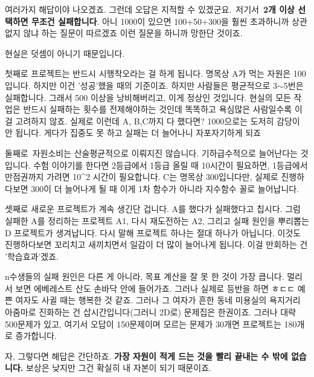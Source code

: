 여러가지 해답이야 나오겠죠.
그런데 오답은 지적할 수 있겠군요. 저기서 \textbf{2개 이상 선택하면 무조건 실패합니다}.
아니 1000이 있으면 100+50+300을 훨씬 초과하니까 상관없지 않냐 하는 질문이 따르겠죠
이런 질문을 하니까 망한단 것이죠.
\vspace{5mm}

현실은 덧셈이 아니기 때문입니다.
\vspace{5mm}

첫째로 프로젝트는 반드시 시행착오라는 걸 하게 됩니다.
명목상 A가 먹는 자원은 100입니다. 하지만 이건 '성공'했을 때의 기준이죠.
하지만 사람들은 평균적으로 3$\sim$5번은 실패합니다. 그래서 500 이상을 낭비해버리고, 이게 정상인 것입니다.
현실의 모든 작업은 반드시 실패하는 횟수를 전제해야하는 것인데 똑똑하고 욕심많은 사람일수록 이걸 고려하지 않죠.
실제로 이런데 A, B,C까지 다 했다면? 1000으로는 도저히 감당이 안 됩니다. 게다가 집중도 못 하고 실패는 더 늘어나니 자포자기하게 되죠
\vspace{5mm}

둘째로 자원소비는 산술평균적으로 이뤄지진 않습니다. 기하급수적으로 늘어난다는 것입니다.
수험 이야기를 한다면 2등급에서 1등급 올릴 때 10시간이 필요하면, 1등급에서 만점권까지 가려면 10^2 시간이 필요합니다.
C는 명목상 300입니다만, 실제로 진행하다보면 300이 더 늘어나게 될 때 이게 1차 함수가 아니라 지수함수 꼴로 늘어납니다.
\vspace{5mm}

셋째로 새로운 프로젝트가 계속 생긴단 겁니다.
A를 했다가 실패했다고 칩시다. 그럼 실패한 A를 정리하는 프로젝트 A1, 다시 재도전하는 A2, 그리고 실패 원인을 뿌리뽑는 D 프로젝트가 생겨납니다.
다시 말해 프로젝트 하나는 절대 하나가 아닙니다. 이것도 진행하다보면 꼬리치고 새끼치면서 일감이 더 많이 늘어나게 됩니다.
이걸 만회하는 건 '학습효과'겠죠.
\vspace{5mm}

n수생들의 실패 원인은 다른 게 아니라, 목표 계산을 잘 못 한 것이 가장 큽니다.
멀리서 보면 에베레스트 산도 손바닥 안에 들어가죠. 그러나 실제로 등반을 하면 ㅎㄷㄷ
예쁜 여자도 사귈 때는 행복한 것 같죠. 그러나 그 여자가 흔한 동네 미용실의 욕지거리 아줌마로 진화하는 건 삽시간입니다(그러니 2D로)
문제집은 한권이죠. 그러나 대략 500문제가 있고, 여기서 오답이 150문제이며 모르는 문제가 30개면 프로젝트는 180개로 증가합니다.
\vspace{5mm}

자, 그렇다면 해답은 간단하죠.
\textbf{가장 자원이 적게 드는 것을 빨리 끝내는 수 밖에 없습니다.}
보상은 낮지만 그건 확실히 내 자본이 되기 때문이죠.
\vspace{5mm}

